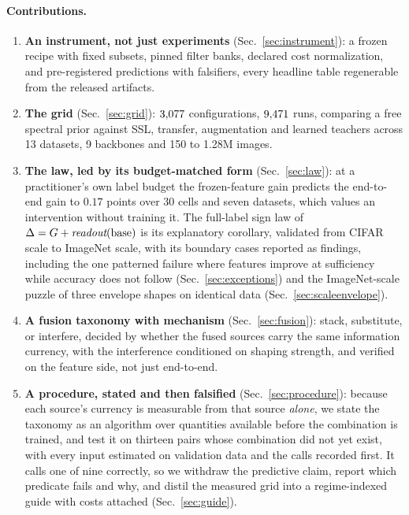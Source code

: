 \paragraph{Contributions.}
\begin{enumerate}
  \item \textbf{An instrument, not just experiments} (Sec.~\ref{sec:instrument}):
    a frozen recipe with fixed subsets, pinned filter banks, declared
    cost normalization, and pre-registered predictions with falsifiers,
    every headline table regenerable from the released artifacts.
  \item \textbf{The grid} (Sec.~\ref{sec:grid}): $3{,}077$ configurations,
  $9{,}471$ runs,
    comparing a free spectral prior against SSL, transfer, augmentation and
    learned teachers across 13 datasets, 9 backbones and
    150 to 1.28M images.
  \item \textbf{The law, led by its budget-matched form}
    (Sec.~\ref{sec:law}): at a practitioner's own label budget the
    frozen-feature gain predicts the end-to-end gain to $0.17$ points over 30
    cells and seven datasets, which values an intervention without training
    it. The full-label sign law of $\Delta = G +
    \textit{readout}(\mathrm{base})$ is its explanatory corollary, validated from
    CIFAR scale to ImageNet scale, with its boundary cases reported as
    findings, including the one patterned failure where features improve at
    sufficiency while accuracy does not follow (Sec.~\ref{sec:exceptions})
    and the ImageNet-scale puzzle of three envelope shapes on identical data
    (Sec.~\ref{sec:scaleenvelope}).
  \item \textbf{A fusion taxonomy with mechanism}
    (Sec.~\ref{sec:fusion}): stack, substitute, or interfere, decided by
    whether the fused sources carry the same information currency, with the
    interference conditioned on shaping strength, and
    verified on the feature side, not just end-to-end.
  \item \textbf{A procedure, stated and then falsified}
    (Sec.~\ref{sec:procedure}): because each source's currency is
    measurable from that source \emph{alone}, we state the taxonomy as an
    algorithm over quantities available before the combination is trained,
    and test it on thirteen pairs whose combination did not yet exist, with
    every input estimated on validation data and the calls recorded first.
    It calls one of nine correctly, so we withdraw the predictive claim,
    report which predicate fails and why, and distil the measured grid into a
    regime-indexed guide with costs attached (Sec.~\ref{sec:guide}).
\end{enumerate}

